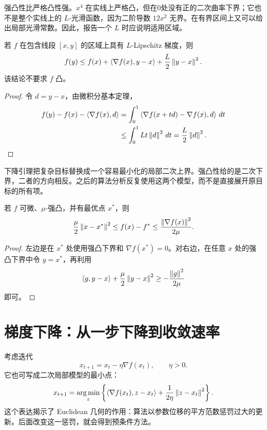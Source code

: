 强凸性比严格凸性强。$x^4$ 在实线上严格凸，但在0处没有正的二次曲率下界；它也不是整个实线上的 $L$-光滑函数，因为二阶导数 $12x^2$ 无界。在有界区间上又可以给出局部光滑常数。因此，报告一个 $L$ 时应说明适用区域。

\begin{lemma}[下降引理]
\label{l1:lemma-descent}
若 $f$ 在包含线段 $[x,y]$ 的区域上具有 $L$-Lipschitz 梯度，则
\begin{equation}
 f(y)\leq f(x)+\left\langle\nabla f(x),y-x\right\rangle
                 +\frac L2\left\lVert y-x\right\rVert^2.
 \label{l1:descent-lemma}
\end{equation}
该结论不要求 $f$ 凸。
\end{lemma}

\begin{proof}
令 $d=y-x$，由微积分基本定理，
\begin{align*}
 f(y)-f(x)-\left\langle\nabla f(x),d\right\rangle
 &=\int_0^1\left\langle\nabla f(x+td)-\nabla f(x),d\right\rangle\,dt\\
 &\leq\int_0^1 Lt\left\lVert d\right\rVert^2\,dt
 =\frac L2\left\lVert d\right\rVert^2.
\end{align*}
\end{proof}

下降引理把复杂目标替换成一个容易最小化的局部二次上界。强凸性给的是二次下界，二者的方向相反。之后的算法分析反复使用这两个模型，而不是直接展开原目标的所有项。

\begin{proposition}[强凸情形的误差证书]
\label{l1:prop-gap}
若 $f$ 可微、$\mu$-强凸，并有最优点 $x^*$，则
\begin{equation}
 \frac\mu2\left\lVert x-x^*\right\rVert^2
 \leq f(x)-f^*
 \leq\frac{\left\lVert\nabla f(x)\right\rVert^2}{2\mu}.
 \label{l1:gap-gradient}
\end{equation}
\end{proposition}

\begin{proof}
左边是在 $x^*$ 处使用强凸下界和 $\nabla f(x^*)=0$。对右边，在任意 $x$ 处的强凸下界中令 $y=x^*$，再利用
\[
 \left\langle g,y-x\right\rangle+\frac\mu2\left\lVert y-x\right\rVert^2
 \geq-\frac{\left\lVert g\right\rVert^2}{2\mu}
\]
即可。
\end{proof}

\section{梯度下降：从一步下降到收敛速率}
\label{l1:gd}

考虑迭代
\begin{equation}
 x_{t+1}=x_t-\eta\nabla f(x_t),\qquad \eta>0.
 \label{l1:gd-update}
\end{equation}
它也可写成二次局部模型的最小点：
\[
 x_{t+1}=\operatorname*{arg\,min}_z
 \left\{\left\langle\nabla f(x_t),z-x_t\right\rangle
       +\frac1{2\eta}\left\lVert z-x_t\right\rVert^2\right\}.
\]
这个表达揭示了 Euclidean 几何的作用：算法以参数位移的平方范数惩罚过大的更新。后面改变这一惩罚，就会得到预条件方法。

